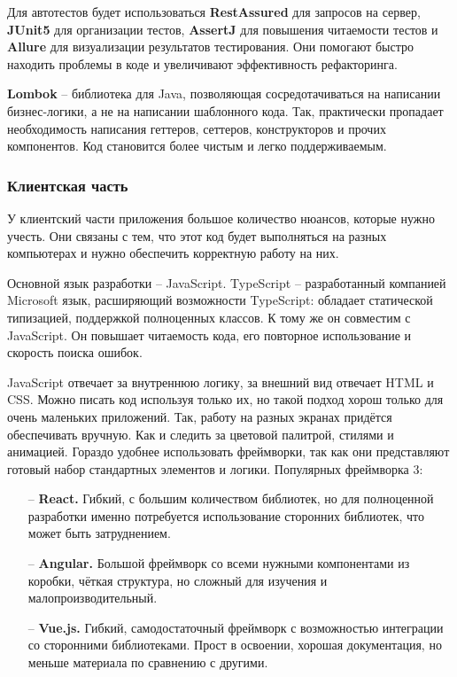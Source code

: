 \documentclass[a4paper,article]{article}
\begin{document}
    Для автотестов будет использоваться \textbf{RestAssured} для запросов на сервер, \textbf{JUnit5} для организации тестов, \textbf{AssertJ} для повышения читаемости тестов и \textbf{Allure} для визуализации результатов тестирования. Они помогают быстро находить проблемы в коде и увеличивают эффективность рефакторинга.

    \textbf{Lombok} -- библиотека для Java, позволяющая сосредотачиваться на написании бизнес-логики, а не на написании шаблонного кода. Так, практически пропадает необходимость написания геттеров, сеттеров, конструкторов и прочих компонентов. Код становится более чистым и легко поддерживаемым.

    \subsubsection{Клиентская часть}\label{Реализация. Выбор. Клиентская часть}

    У клиентский части приложения большое количество нюансов, которые нужно учесть. Они связаны с тем, что этот код будет выполняться на разных компьютерах и нужно обеспечить корректную работу на них.

    Основной язык разработки -- JavaScript. TypeScript -- разработанный компанией Microsoft язык, расширяющий возможности TypeScript: обладает статической типизацией, поддержкой полноценных классов. К тому же он совместим с JavaScript. Он повышает читаемость кода, его повторное использование и скорость поиска ошибок.

    JavaScript отвечает за внутреннюю логику, за внешний вид отвечает HTML и CSS. Можно писать код используя только их, но такой подход хорош только для очень маленьких приложений. Так, работу на разных экранах придётся обеспечивать вручную. Как и следить за цветовой палитрой, стилями и анимацией. Гораздо удобнее использовать фреймворки, так как они представляют готовый набор стандартных элементов и логики. Популярных фреймворка 3:

        \begin{itemize}[nolistsep]
        \item[--] \textbf{React.} Гибкий, с большим количеством библиотек, но для полноценной разработки именно потребуется использование сторонних библиотек, что может быть затруднением.
        \item[--] \textbf{Angular.} Большой фреймворк со всеми нужными компонентами из коробки, чёткая структура, но сложный для изучения и малопроизводительный.
        \item[--] \textbf{Vue.js.} Гибкий, самодостаточный фреймворк с возможностью интеграции со сторонними библиотеками. Прост в освоении, хорошая документация, но меньше материала по сравнению с другими.
    \end{itemize}
\end{document}
